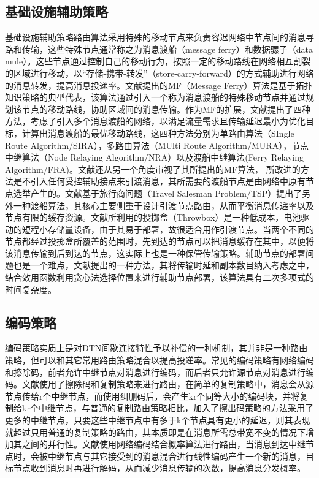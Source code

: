 \subsection{基础设施辅助策略}
基础设施辅助策略路由算法采用特殊的移动节点来负责容迟网络中节点间的消息寻路和传输，这些特殊节点通常称之为消息渡船（message ferry）和数据骡子（data mule）。这些节点通过控制自己的移动行为，按照一定的移动路线在网络相互割裂的区域进行移动，以“存储-携带-转发”（store-carry-forward）的方式辅助进行网络的消息转发，提高消息投递率。文献\cite{Zhao2004}提出的MF（Message Ferry）算法是基于拓扑知识策略的典型代表，该算法通过引入一个称为消息渡船的特殊移动节点并通过规划该节点的移动路线，协助区域间的消息传输。作为MF的扩展，文献\cite{Zhao2005}提出了四种方法，考虑了引入多个消息渡船的网络，以满足流量需求且传输延迟最小为优化目标，计算出消息渡船的最优移动路线，这四种方法分别为单路由算法（SIngle Route Algorithm/SIRA），多路由算法（MUlti Route Algorithm/MURA），节点中继算法（Node Relaying Algorithm/NRA）以及渡船中继算法(Ferry Relaying Algorithm/FRA)。文献\cite{Zhao2005}还从另一个角度审视了其所提出的MF算法， 所改进的方法是不引入任何受控辅助接点来引渡消息，其所需要的渡船节点是由网络中原有节点选举产生的。文献\cite{Zhang:2007bq}基于旅行商问题（Travel Salesman Problem/TSP）提出了另外一种渡船算法，其核心主要侧重于设计引渡节点路由，从而平衡消息传递率以及节点有限的缓存资源。文献\cite{Banerjee:2007hm}所利用的投掷盒（Throwbox）是一种低成本，电池驱动的短程小存储量设备，由于其易于部署，故很适合用作引渡节点。当两个不同的节点都经过投掷盒所覆盖的范围时，先到达的节点可以把消息缓存在其中，以便将该消息传输到后到达的节点，这实际上也是一种保管传输策略。辅助节点的部署问题也是一个难点，文献\cite{He:2010ks}提出的一种方法，其将传输时延和副本数目纳入考虑之中，结合效用函数利用贪心法选择位置来进行辅助节点部署，该算法具有二次多项式的时间复杂度。


\subsection{编码策略}
编码策略实质上是对DTN间歇连接特性予以补偿的一种机制，其并非是一种路由策略，但可以和其它常用路由策略混合以提高投递率。常见的编码策略有网络编码和擦除码，前者允许中继节点对消息进行编码，而后者只允许源节点对消息进行编码。文献\cite{Wang:2005ka}使用了擦除码和复制策略来进行路由，在简单的复制策略中，消息会从源节点传给r个中继节点，而使用纠删码后，会产生kr个同等大小的编码块，并将复制给kr个中继节点，与普通的复制路由策略相比，加入了擦出码策略的方法采用了更多的中继节点，只要这些中继节点中有多于k个节点具有更小的延迟，则其表现就超过只用普通的复制策略的路由，其本质即是在消息所需总带宽不变的情况下增加其之间的并行性。文献\cite{Jain2005}使用网络编码结合概率算法进行路由，当消息到达中继节点时，会被中继节点与其它接受到的消息混合进行线性编码产生一个新的消息，目标节点收到消息时再进行解码，从而减少消息传输的次数，提高消息分发概率。


